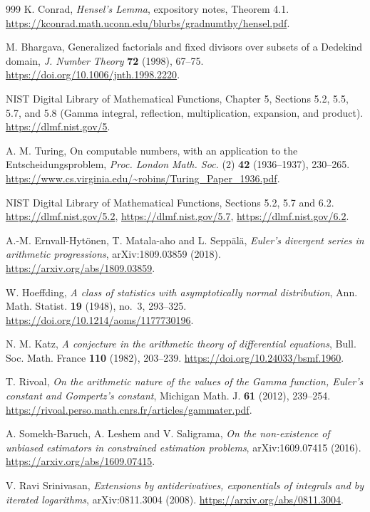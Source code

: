 \documentclass[11pt,a4paper]{article}
\theoremstyle{definition}
\theoremstyle{remark}
\numberwithin{equation}{section}
\begin{document}
\begin{thebibliography}{999}
K. Conrad, \emph{Hensel's Lemma}, expository notes, Theorem 4.1.
\url{https://kconrad.math.uconn.edu/blurbs/gradnumthy/hensel.pdf}.

M. Bhargava, Generalized factorials and fixed divisors over subsets of
a Dedekind domain, \emph{J. Number Theory} \textbf{72} (1998), 67--75.
\url{https://doi.org/10.1006/jnth.1998.2220}.

NIST Digital Library of Mathematical Functions, Chapter 5,
Sections 5.2, 5.5, 5.7, and 5.8 (Gamma integral, reflection,
multiplication, expansion, and product).
\url{https://dlmf.nist.gov/5}.

A. M. Turing, On computable numbers, with an application to the
Entscheidungsproblem, \emph{Proc. London Math. Soc.} (2) \textbf{42}
(1936--1937), 230--265.
\url{https://www.cs.virginia.edu/~robins/Turing_Paper_1936.pdf}.


NIST Digital Library of Mathematical Functions,
Sections 5.2, 5.7 and 6.2.
\url{https://dlmf.nist.gov/5.2},
\url{https://dlmf.nist.gov/5.7},
\url{https://dlmf.nist.gov/6.2}.

A.-M. Ernvall-Hyt\"onen, T. Matala-aho and L. Sepp\"al\"a,
\emph{Euler's divergent series in arithmetic progressions},
arXiv:1809.03859 (2018).
\url{https://arxiv.org/abs/1809.03859}.

W. Hoeffding,
\emph{A class of statistics with asymptotically normal distribution},
Ann. Math. Statist. \textbf{19} (1948), no.~3, 293--325.
\url{https://doi.org/10.1214/aoms/1177730196}.

N. M. Katz,
\emph{A conjecture in the arithmetic theory of differential equations},
Bull. Soc. Math. France \textbf{110} (1982), 203--239.
\url{https://doi.org/10.24033/bsmf.1960}.

T. Rivoal,
\emph{On the arithmetic nature of the values of the Gamma function,
Euler's constant and Gompertz's constant},
Michigan Math. J. \textbf{61} (2012), 239--254.
\url{https://rivoal.perso.math.cnrs.fr/articles/gammater.pdf}.

A. Somekh-Baruch, A. Leshem and V. Saligrama,
\emph{On the non-existence of unbiased estimators in constrained
estimation problems}, arXiv:1609.07415 (2016).
\url{https://arxiv.org/abs/1609.07415}.

V. Ravi Srinivasan,
\emph{Extensions by antiderivatives, exponentials of integrals and
by iterated logarithms}, arXiv:0811.3004 (2008).
\url{https://arxiv.org/abs/0811.3004}.


\end{thebibliography}
\end{document}
